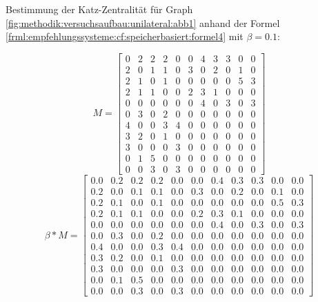 Bestimmung der Katz-Zentralität für Graph \ref{fig:methodik:versuchsaufbau:unilateral:abb1} anhand der Formel \ref{frml:empfehlungssysteme:cf:speicherbasiert:formel4} mit $\beta = 0.1$:

\begin{equation}
	M = \begin{bmatrix}
		0 & 2 & 2 & 2 & 0 & 0 & 4 & 3 & 3 & 0 & 0\\
		2 & 0 & 1 & 1 & 0 & 3 & 0 & 2 & 0 & 1 & 0\\
		2 & 1 & 0 & 1 & 0 & 0 & 0 & 0 & 0 & 5 & 3\\
		2 & 1 & 1 & 0 & 0 & 2 & 3 & 1 & 0 & 0 & 0\\
		0 & 0 & 0 & 0 & 0 & 0 & 4 & 0 & 3 & 0 & 3\\
		0 & 3 & 0 & 2 & 0 & 0 & 0 & 0 & 0 & 0 & 0\\
		4 & 0 & 0 & 3 & 4 & 0 & 0 & 0 & 0 & 0 & 0\\
		3 & 2 & 0 & 1 & 0 & 0 & 0 & 0 & 0 & 0 & 0\\
		3 & 0 & 0 & 0 & 3 & 0 & 0 & 0 & 0 & 0 & 0\\
		0 & 1 & 5 & 0 & 0 & 0 & 0 & 0 & 0 & 0 & 0\\
		0 & 0 & 3 & 0 & 3 & 0 & 0 & 0 & 0 & 0 & 0
	\end{bmatrix}
	\label{frml:berechnungDerKatzZentralitaetPseudoMitarbeiter:formel1}
\end{equation}
\begin{equation}
	\beta * M = \begin{bmatrix}
		0.0 & 0.2 & 0.2 & 0.2 & 0.0 & 0.0 & 0.4 & 0.3 & 0.3 & 0.0 & 0.0\\
		0.2 & 0.0 & 0.1 & 0.1 & 0.0 & 0.3 & 0.0 & 0.2 & 0.0 & 0.1 & 0.0\\
		0.2 & 0.1 & 0.0 & 0.1 & 0.0 & 0.0 & 0.0 & 0.0 & 0.0 & 0.5 & 0.3\\
		0.2 & 0.1 & 0.1 & 0.0 & 0.0 & 0.2 & 0.3 & 0.1 & 0.0 & 0.0 & 0.0\\
		0.0 & 0.0 & 0.0 & 0.0 & 0.0 & 0.0 & 0.4 & 0.0 & 0.3 & 0.0 & 0.3\\
		0.0 & 0.3 & 0.0 & 0.2 & 0.0 & 0.0 & 0.0 & 0.0 & 0.0 & 0.0 & 0.0\\
		0.4 & 0.0 & 0.0 & 0.3 & 0.4 & 0.0 & 0.0 & 0.0 & 0.0 & 0.0 & 0.0\\
		0.3 & 0.2 & 0.0 & 0.1 & 0.0 & 0.0 & 0.0 & 0.0 & 0.0 & 0.0 & 0.0\\
		0.3 & 0.0 & 0.0 & 0.0 & 0.3 & 0.0 & 0.0 & 0.0 & 0.0 & 0.0 & 0.0\\
		0.0 & 0.1 & 0.5 & 0.0 & 0.0 & 0.0 & 0.0 & 0.0 & 0.0 & 0.0 & 0.0\\
		0.0 & 0.0 & 0.3 & 0.0 & 0.3 & 0.0 & 0.0 & 0.0 & 0.0 & 0.0 & 0.0
	\end{bmatrix}
	\label{frml:katzZentralitaetPseudoMitarbeiter:formel2}
\end{equation}
